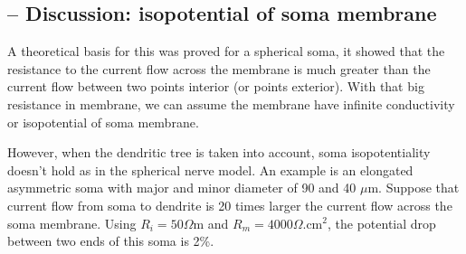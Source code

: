 \subsection{-- Discussion: isopotential of soma membrane}
\label{sec:disc-isop-soma}

A theoretical basis for this was proved for a spherical soma, it
showed that the resistance to the current flow across the membrane is
much greater than the current flow between two points interior (or
points exterior). With that big resistance in membrane, we can assume
the membrane have infinite conductivity or isopotential of soma
membrane.

However, when the dendritic tree is taken into account, soma
isopotentiality doesn't hold as in the spherical nerve model. An
example is an elongated asymmetric soma with major and minor diameter
of 90 and 40 $\mu$m. Suppose that current flow from soma to dendrite
is 20 times larger the current flow across the soma membrane. Using
$R_i=50\Omega$m and $R_m=4000\Omega$.cm$^2$, the potential drop
between two ends of this soma is 2\%.




